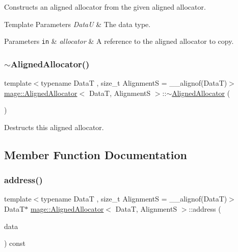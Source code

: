 Constructs an aligned allocator from the given aligned allocator.


\begin{DoxyTemplParams}{Template Parameters}
{\em DataU} & The data type. \\
\hline
\end{DoxyTemplParams}

\begin{DoxyParams}[1]{Parameters}
\mbox{\tt in}  & {\em allocator} & A reference to the aligned allocator to copy. \\
\hline
\end{DoxyParams}
\hypertarget{structmage_1_1_aligned_allocator_a98bda5c375a177eaa71cd622622451eb}{}\label{structmage_1_1_aligned_allocator_a98bda5c375a177eaa71cd622622451eb} 
\subsubsection{\texorpdfstring{$\sim$\+Aligned\+Allocator()}{~AlignedAllocator()}}
{\footnotesize\ttfamily template$<$typename DataT , size\+\_\+t AlignmentS = \+\_\+\+\_\+alignof(\+Data\+T)$>$ \\
\hyperlink{structmage_1_1_aligned_allocator}{mage\+::\+Aligned\+Allocator}$<$ DataT, AlignmentS $>$\+::$\sim$\hyperlink{structmage_1_1_aligned_allocator}{Aligned\+Allocator} (\begin{DoxyParamCaption}{ }\end{DoxyParamCaption})\hspace{0.3cm}{\ttfamily [default]}}

Destructs this aligned allocator. 

\subsection{Member Function Documentation}
\hypertarget{structmage_1_1_aligned_allocator_a8c7fc099279194e37afa8e4dae1a64fa}{}\label{structmage_1_1_aligned_allocator_a8c7fc099279194e37afa8e4dae1a64fa} 
\subsubsection{\texorpdfstring{address()}{address()}\hspace{0.1cm}{\footnotesize\ttfamily [1/2]}}
{\footnotesize\ttfamily template$<$typename DataT , size\+\_\+t AlignmentS = \+\_\+\+\_\+alignof(\+Data\+T)$>$ \\
DataT$\ast$ \hyperlink{structmage_1_1_aligned_allocator}{mage\+::\+Aligned\+Allocator}$<$ DataT, AlignmentS $>$\+::address (\begin{DoxyParamCaption}\item[{DataT \&}]{data }\end{DoxyParamCaption}) const\hspace{0.3cm}{\ttfamily [noexcept]}}

